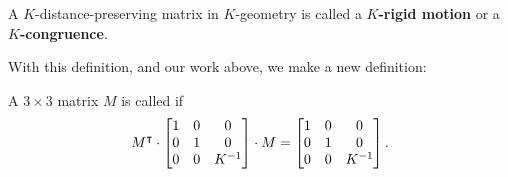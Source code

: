 \documentclass[newpage,hints,handout,noauthor,nooutcomes,12pt]{ximera}
\begin{document}





\begin{definition}
A $K$-distance-preserving matrix in $K$-geometry is called a
$K$\textbf{-rigid motion} or a $K$\textbf{-congruence}.
\end{definition}

With this definition, and our work above, we make a new definition:


\begin{definition}
A $3\times3$ matrix $M$ is called  if
\[
M^\transpose\cdot\begin{bmatrix}
1 & 0 & 0\\
0 & 1 & 0\\
0 & 0 & K^{-1}%
\end{bmatrix} \cdot M=\begin{bmatrix}
1 & 0 & 0\\
0 & 1 & 0\\
0 & 0 & K^{-1}%
\end{bmatrix}.
\]
\end{definition}
\end{document}
